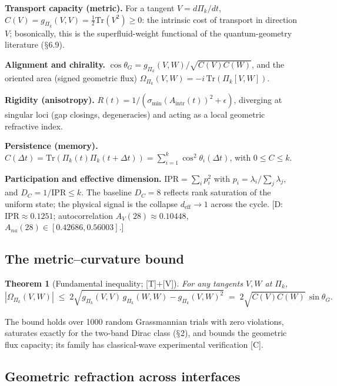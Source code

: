 \documentclass[11pt]{article}
\theoremstyle{definition}
\theoremstyle{plain}
\newtheorem{theorem}[definition]{Theorem}
\begin{document}
\textbf{Transport capacity (metric).} For a tangent $V = d\Pi_k/dt$,
$C(V) = g_{\Pi_k}(V,V) = \tfrac{1}{2}\mathrm{Tr}(V^2) \ge 0$: the intrinsic cost of
transport in direction $V$; bosonically, this is the superfluid-weight functional
of the quantum-geometry literature ($\mathsection$6.9).

\textbf{Alignment and chirality.}
$\cos\theta_G = g_{\Pi_k}(V,W)/\sqrt{C(V)C(W)}$, and the oriented area (signed
geometric flux) $\Omega_{\Pi_k}(V,W) = -i\,\mathrm{Tr}(\Pi_k[V,W])$.

\textbf{Rigidity (anisotropy).}
$R(t) = 1/(\sigma_{\min}(A_{\mathrm{intr}}(t))^2 + \epsilon)$, diverging at singular
loci (gap closings, degeneracies) and acting as a local geometric refractive index.

\textbf{Persistence (memory).}
$C(\Delta t) = \mathrm{Tr}(\Pi_k(t)\Pi_k(t+\Delta t)) = \sum_{i=1}^{k}
\cos^2\theta_i(\Delta t)$, with $0 \le C \le k$.

\textbf{Participation and effective dimension.}
$\mathrm{IPR} = \sum_i p_i^2$ with $p_i = \lambda_i/\sum_j \lambda_j$, and
$D_C = 1/\mathrm{IPR} \le k$. The baseline $D_C = 8$ reflects rank saturation of
the uniform state; the physical signal is the collapse
$d_{\mathrm{eff}} \to 1$ across the cycle. [D: $\mathrm{IPR} \approx 0.1251$;
autocorrelation $A_V(28) \approx 0.10448$,
$A_{na}(28) \in [0.42686, 0.56003]$.]

\subsection{The metric--curvature bound}

\begin{theorem}[Fundamental inequality; {[T]}$+${[V]}]
For any tangents $V,W$ at $\Pi_k$,
\begin{equation}
|\Omega_{\Pi_k}(V,W)| \;\le\; 2\sqrt{g_{\Pi_k}(V,V)\,g_{\Pi_k}(W,W) -
g_{\Pi_k}(V,W)^2} \;=\; 2\sqrt{C(V)C(W)}\,\sin\theta_G .
\end{equation}
\end{theorem}

The bound holds over 1000 random Grassmannian trials with zero violations,
saturates exactly for the two-band Dirac class ($\mathsection$2), and bounds the geometric
flux capacity; its family has classical-wave experimental verification [C].

\subsection{Geometric refraction across interfaces}
\end{document}
